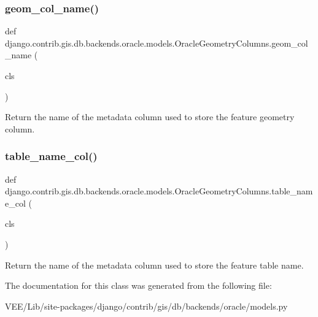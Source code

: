 \subsubsection{\texorpdfstring{geom\+\_\+col\+\_\+name()}{geom\_col\_name()}}
{\footnotesize\ttfamily def django.\+contrib.\+gis.\+db.\+backends.\+oracle.\+models.\+Oracle\+Geometry\+Columns.\+geom\+\_\+col\+\_\+name (\begin{DoxyParamCaption}\item[{}]{cls }\end{DoxyParamCaption})}

\begin{DoxyVerb}Return the name of the metadata column used to store the feature
geometry column.
\end{DoxyVerb}
 \mbox{\label{classdjango_1_1contrib_1_1gis_1_1db_1_1backends_1_1oracle_1_1models_1_1_oracle_geometry_columns_a50773f9657396ac35cf79e111c9f6d7a}} 
\subsubsection{\texorpdfstring{table\+\_\+name\+\_\+col()}{table\_name\_col()}}
{\footnotesize\ttfamily def django.\+contrib.\+gis.\+db.\+backends.\+oracle.\+models.\+Oracle\+Geometry\+Columns.\+table\+\_\+name\+\_\+col (\begin{DoxyParamCaption}\item[{}]{cls }\end{DoxyParamCaption})}

\begin{DoxyVerb}Return the name of the metadata column used to store the feature table
name.
\end{DoxyVerb}
 

The documentation for this class was generated from the following file\+:\begin{DoxyCompactItemize}
\item 
V\+E\+E/\+Lib/site-\/packages/django/contrib/gis/db/backends/oracle/models.\+py\end{DoxyCompactItemize}
